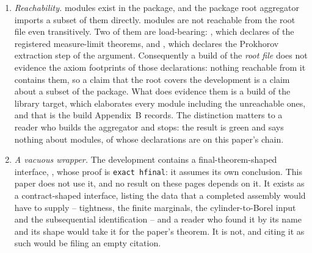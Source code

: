 \begin{enumerate}

\item \emph{Reachability.} \NumCleanModules{} modules exist in the package, and
  the package root aggregator imports a subset of them directly.
  \NumUnreachableModules{} modules are not reachable from the root file even
  transitively. Two of them are load-bearing:
  , which declares
  \NumUnreachableChainTheorems{} of the \NumMeasureContractTheorems{} registered
  measure-limit theorems, and
  , which declares the Prokhorov
  extraction step of the argument. Consequently a build of the \emph{root file}
  does not evidence the axiom footprints of those declarations: nothing reachable
  from it contains them, so a claim that the root covers the development is a
  claim about a subset of the package. What does evidence them is a build of the
  library target, which elaborates every module including the unreachable ones,
  and that is the build Appendix~B records. The distinction matters to a reader
  who builds the aggregator and stops: the result is green and says nothing about
  \NumUnreachableModules{} modules, \NumUnreachableChainTheorems{} of whose
  declarations are on this paper's chain.

\item \emph{A vacuous wrapper.} The development contains a
  final-theorem-shaped interface,
  , whose proof is
  \texttt{exact hfinal}: it assumes its own conclusion. This paper does not use
  it, and no result on these pages depends on it. It exists as a contract-shaped
  interface, listing the data that a completed assembly would have to supply --
  tightness, the finite marginals, the cylinder-to-Borel input and the
  subsequential identification -- and a reader who found it by its name and its
  shape would take it for the paper's theorem. It is not, and citing it as such
  would be filing an empty citation.


\end{enumerate}
